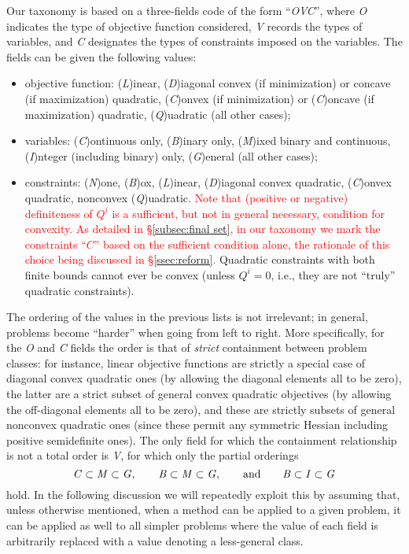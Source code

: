 Our taxonomy is based on a three-fields code of the form ``\textit{OVC}'', where \textit{O} indicates the type of objective function considered, \textit{V} records the types of variables, and \textit{C} designates the types of constraints imposed on the variables. The fields can be given the following values:
%
\begin{itemize}
 \item objective function: (\textit{L})inear, (\textit{D})iagonal convex (if minimization) or concave (if maximization) quadratic, (\textit{C})onvex (if minimization) or (\textit{C})oncave (if maximization) quadratic,  (\textit{Q})uadratic (all other cases);
 \item variables: (\textit{C})ontinuous only, (\textit{B})inary only, (\textit{M})ixed binary and continuous, (\textit{I})nteger (including binary) only, (\textit{G})eneral (all other cases);
 \item constraints: (\textit{N})one, (\textit{B})ox, (\textit{L})inear, (\textit{D})iagonal convex quadratic, (\textit{C})on\-vex quadratic, nonconvex (\textit{Q})uadratic.
    \textcolor{red}{Note that (positive or negative) definiteness of $Q^i$ is a sufficient, but not in general necessary, condition for convexity. As detailed in \S\ref{subsec:final set}, in our taxonomy we mark the constraints ``$C$'' based on the sufficient condition alone, the rationale of this choice being discussed in \S\ref{ssec:reform}.}
  Quadratic constraints with both finite bounds cannot ever be convex (unless $Q^i = 0$, i.e., they are not ``truly'' quadratic constraints).
\end{itemize}

The ordering of the values in the previous lists is not irrelevant; in general, problems become ``harder'' when going from left to right. More specifically, for the \textit{O} and \textit{C} fields the order is that of \emph{strict} containment between problem classes: for instance, linear objective functions are strictly a special case of diagonal convex quadratic ones (by allowing the diagonal elements all to be zero), the latter are a strict subset of general convex quadratic objectives (by allowing the off-diagonal elements all to be zero), and these are strictly subsets of general nonconvex quadratic ones (since these permit any symmetric Hessian including positive semidefinite ones). The only field for which the containment relationship is not a total order is \textit{V}, for which only the partial orderings
\[
 \mbox{\textit{C}} \subset \mbox{\textit{M}} \subset \mbox{\textit{G}},
 \qquad
 \mbox{\textit{B}} \subset \mbox{\textit{M}} \subset \mbox{\textit{G}},
 \qquad
 \mbox{and}
 \qquad
 \mbox{\textit{B}} \subset \mbox{\textit{I}} \subset \mbox{\textit{G}}
\]
hold. In the following discussion we will repeatedly exploit this by assuming that, unless otherwise mentioned, when a method can be applied to a given problem, it can be applied as well to all simpler problems where the value of each field is arbitrarily replaced with a value denoting a less-general class.

